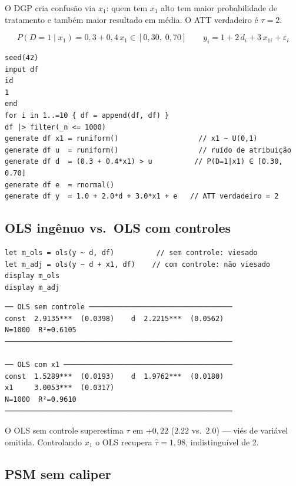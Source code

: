 O DGP cria confusão via $x_1$: quem tem $x_1$ alto tem maior probabilidade
de tratamento e também maior resultado em média. O ATT verdadeiro é $\tau = 2$.

\[
  P(D=1 \mid x_1) = 0{,}3 + 0{,}4\,x_1 \in [0{,}30,\; 0{,}70]
  \qquad
  y_i = 1 + 2\,d_i + 3\,x_{1i} + \varepsilon_i
\]

\begin{lstlisting}[caption={DGP com seleção em observáveis}]
seed(42)
input df
id
1
end
for i in 1..=10 { df = append(df, df) }
df |> filter(_n <= 1000)
generate df x1 = runiform()                   // x1 ~ U(0,1)
generate df u  = runiform()                   // ruído de atribuição
generate df d  = (0.3 + 0.4*x1) > u          // P(D=1|x1) ∈ [0.30, 0.70]
generate df e  = rnormal()
generate df y  = 1.0 + 2.0*d + 3.0*x1 + e   // ATT verdadeiro = 2
\end{lstlisting}

\subsection*{OLS ingênuo vs.\ OLS com controles}

\begin{lstlisting}[caption={Comparação OLS sem e com controle de x1}]
let m_ols = ols(y ~ d, df)          // sem controle: viesado
let m_adj = ols(y ~ d + x1, df)    // com controle: não viesado
display m_ols
display m_adj
\end{lstlisting}

\begin{lstlisting}[language={}, basicstyle=\ttfamily\small,
  frame=none, numbers=none, backgroundcolor=\color{codbg},
  xleftmargin=0pt, xrightmargin=0pt, breaklines=false]
── OLS sem controle ──────────────────────────────────
const  2.9135***  (0.0398)    d  2.2215***  (0.0562)
N=1000  R²=0.6105
──────────────────────────────────────────────────────

── OLS com x1 ────────────────────────────────────────
const  1.5289***  (0.0193)    d  1.9762***  (0.0180)
x1     3.0053***  (0.0317)
N=1000  R²=0.9610
──────────────────────────────────────────────────────
\end{lstlisting}

O OLS sem controle superestima $\tau$ em $+0{,}22$ (2.22 vs.\ 2.0) — viés
de variável omitida. Controlando $x_1$ o OLS recupera $\hat\tau = 1{,}98$,
indistinguível de 2.

\subsection*{PSM sem caliper}

